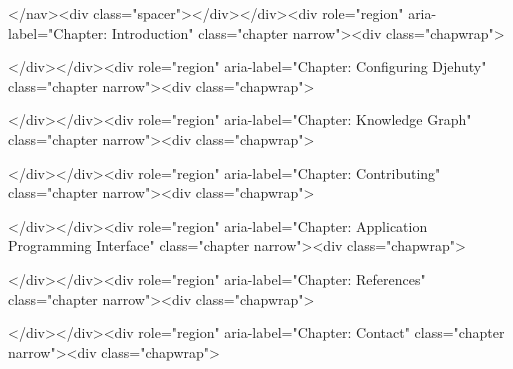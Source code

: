 \documentclass[12pt,a4paper]{book}
\begin{document}
{{{{{{\tableofcontents

\ifdefined\HCode
\else
\listoffigures
\fi

\newpage{}
\hypersetup{linkcolor=LinkGray}
\setcounter{page}{1}

\ifdefined\HCode
\begin{html}
</nav><div class="spacer"></div></div><div role="region" aria-label="Chapter: Introduction" class="chapter narrow"><div class="chapwrap">
\end{html}
\fi



\ifdefined\HCode
\begin{html}
</div></div><div role="region" aria-label="Chapter: Configuring Djehuty" class="chapter narrow"><div class="chapwrap">
\end{html}
\fi



\ifdefined\HCode
\begin{html}
</div></div><div role="region" aria-label="Chapter: Knowledge Graph" class="chapter narrow"><div class="chapwrap">
\end{html}
\fi



\ifdefined\HCode
\begin{html}
</div></div><div role="region" aria-label="Chapter: Contributing" class="chapter narrow"><div class="chapwrap">
\end{html}
\fi



\ifdefined\HCode
\begin{html}
</div></div><div role="region" aria-label="Chapter: Application Programming Interface" class="chapter narrow"><div class="chapwrap">
\end{html}
\fi



\ifdefined\HCode
\begin{html}
</div></div><div role="region" aria-label="Chapter: References" class="chapter narrow"><div class="chapwrap">
\end{html}
\fi



\ifdefined\HCode
\begin{html}
</div></div><div role="region" aria-label="Chapter: Contact" class="chapter narrow"><div class="chapwrap">
\end{html}
\fi

}}}}}}
\end{document}
